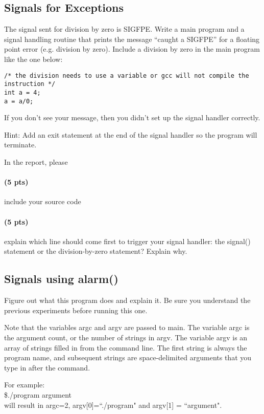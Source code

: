 \documentclass[letterpaper,10pt]{article}
\begin{document}
\subsection{Signals for Exceptions}
The signal sent for division by zero is SIGFPE. Write a main program and a signal handling
routine that prints the message ``caught a SIGFPE'' for a floating point error (e.g. division by
zero). Include a division by zero in the main program like the one below:
\begin{verbatim}
/* the division needs to use a variable or gcc will not compile the instruction */
int a = 4;
a = a/0;
\end{verbatim}

If you don't see your message, then you didn't set up the signal handler correctly.

Hint: Add an exit statement at the end of the signal handler so the program will terminate.

In the report, please

\paragraph{(5 pts)} include your source code
\paragraph{(5 pts)} explain which line should come first to trigger your signal handler: the signal()
         statement or the division-by-zero statement? Explain why.

\subsection{Signals using alarm()}
Figure out what this program does and explain it. Be sure you understand the previous
experiments before running this one.

Note that the variables argc and argv are passed to main. The variable argc is the argument count,
or the number of strings in argv. The variable argv is an array of strings filled in from the
command line. The first string is always the program name, and subsequent strings are space-delimited
arguments that you type in after the command.

For example:\\

\noindent \$./program argument\\

will result in argc=2, argv[0]=``./program" and argv[1] = ``argument".
\end{document}
